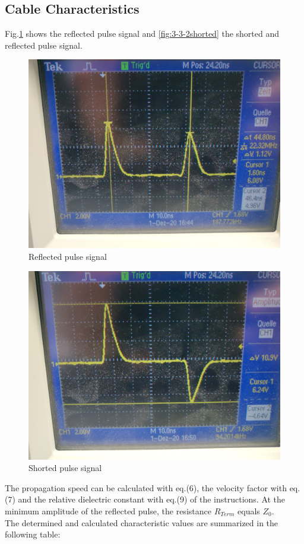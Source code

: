 \subsection{Cable Characteristics}
Fig.\ref{fig:3-3-2reflectiontime} shows the reflected pulse signal and \vref{fig:3-3-2shorted} the shorted and reflected pulse signal.
\begin{figure}[p]
 \centering
 \includegraphics[width=0.7\linewidth]{messdaten/3-3-2_reflectionTime}
 \caption[Reflected pulse signal]{Reflected pulse signal}
 \label{fig:3-3-2reflectiontime}
\end{figure}
\begin{figure}[p]
 \centering
 \includegraphics[width=0.7\linewidth]{messdaten/3-3-2_shorted}
 \caption[Shorted pulse signal]{Shorted pulse signal}
 \label{fig:3-3-2shorted}
\end{figure}
The propagation speed can be calculated with eq.(6), the velocity factor with eq.(7) and the relative dielectric constant with eq.(9) of the instructions. At the minimum amplitude of the reflected pulse, the resistance $ R_{Term} $ equals $ Z_0 $.\\
The determined and calculated characteristic values are summarized in the following table:
